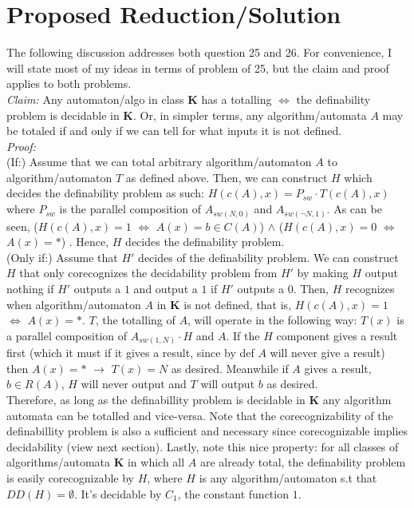 \documentclass{article}
\newcommand{\K}{$\bm{K}$}
\newcommand{\aaa}{algorithm/automaton}
\begin{document}
\section{Proposed Reduction/Solution}
The following discussion addresses both question 25 and 26. For convenience, I will state most of my ideas in terms of problem of 25, but the claim and proof applies to both problems. \\

\noindent{}\textit{Claim:} Any automaton/algo in class \K{} has a totalling $\iff{}$ the definability problem is decidable in \K{}. Or, in simpler terms, any algorithm/automata $A$ may be totaled if and only if we can tell for what inputs it is not defined.\\

\noindent{}\textit{Proof:} \\
(If:) Assume that we can total arbitrary \aaa{} $A$ to \aaa{} $T$ as defined above. Then, we can construct $H$ which decides the definability problem as such: $H(c(A),x)=P_{sw}\cdot{}T(c(A),x)$ where $P_{sw}$ is the parallel composition of $A_{sw(N,0)}$ and $A_{sw(\lnot{}N, 1)}$. As can be seen, ($H(c(A), x)=1$ $\iff{}$ $A(x)=b\in{}C(A)$) $\wedge{}$ ($H(c(A), x)=0$ $\iff{}$ $A(x)=*$) . Hence, $H$ decides the definability problem.\\
(Only if:) Assume that $H'$ decides of the definability problem. We can construct $H$ that only corecognizes the decidability problem from $H'$ by making $H$ output nothing if $H'$ outputs a $1$ and output a $1$ if $H'$ outputs a $0$. Then, $H$ recognizes when \aaa{} $A$ in \K{} is not defined, that is, $H(c(A), x)=1$ $\iff{}$ $A(x)=*$. $T$, the totalling of $A$, will operate in the following way: $T(x)$ is a parallel composition of $A_{sw(1,N)}\cdot{}H$ and $A$. If the $H$ component gives a result first (which it must if it gives a result, since by def $A$ will never give a result) then $A(x)=*$ $\rightarrow{}$ $T(x)=N$ as desired. Meanwhile if $A$ gives a result, $b\in{}R(A)$, $H$ will never output and $T$ will output $b$ as desired.\\

Therefore, as long as the definabillity problem is decidable in \K{} any algorithm automata can be totalled and vice-versa. Note that the corecognizability of the definabillity problem is also a sufficient and necessary since corecognizable implies decidability (view next section). Lastly, note this nice property: for all classes of algorithms/automata \K{} in which all $A$ are already total, the definability problem is easily corecognizable by $H$, where $H$ is any \aaa{} s.t that $DD(H)=\emptyset{}$. It's decidable by $C_1$, the constant function $1$. 
\end{document}
